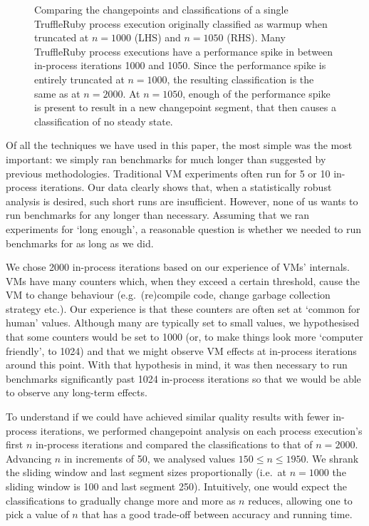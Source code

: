 \documentclass[acmsmall]{acmart}\settopmatter{printfolios=true}
\begin{document}
\begin{figure}[!tbp]
\begin{minipage}[t]{0.485\textwidth}
\end{minipage}
\caption{ Comparing the changepoints and classifications of a
single TruffleRuby process execution originally classified as warmup when
truncated at $n = 1000$ (LHS) and $n = 1050$ (RHS). Many TruffleRuby process
executions have a performance spike in between in-process iterations 1000 and
1050. Since the performance spike is entirely truncated at $n=1000$,
the resulting classification is the same as at $n=2000$. At $n=1050$,
enough of the performance spike is present to result in a new changepoint segment,
that then causes a classification of no steady state.}
\label{fig:truncated}
\end{figure}

Of all the techniques we have used in this paper, the most simple was the most
important: we simply ran benchmarks for much longer than suggested by previous methodologies.
Traditional VM experiments often run for 5 or 10 in-process iterations. Our data
clearly shows that, when a statistically robust analysis is desired, such short
runs are insufficient. However, none of us wants to run benchmarks for any longer
than necessary. Assuming that we ran
experiments for `long enough', a reasonable question is whether we needed to run
benchmarks for as long as we did.

We chose 2000 in-process iterations based on our experience of VMs' internals.
VMs have many counters which, when they exceed a certain threshold, cause the VM
to change behaviour (e.g.~(re)compile code, change garbage collection strategy
etc.). Our experience is that these counters are often set at `common for human'
values. Although many are typically set to small values, we hypothesised that some
counters would be set to 1000 (or, to make things look more `computer friendly',
to 1024) and that we might observe VM effects at in-process iterations
around this point. With that hypothesis in mind, it was then necessary to
run benchmarks significantly past 1024 in-process iterations so that we would
be able to observe any long-term effects.

To understand if we could have achieved similar quality results with fewer in-process
iterations, we performed changepoint analysis on each process execution's first
$n$ in-process iterations and compared the classifications to that of $n=2000$.
Advancing $n$ in increments of 50, we analysed values $150 \leq n \leq 1950$. We shrank the
sliding window and last segment sizes proportionally (i.e.~at $n=1000$ the
sliding window is 100 and last segment 250). Intuitively, one
would expect the classifications to gradually change more and more as $n$ reduces, allowing
one to pick a value of $n$ that has a good trade-off between accuracy and running time.
\end{document}
